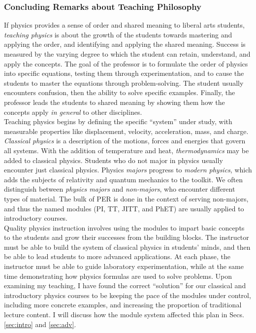 \documentclass[../../../main.tex]{subfiles}
\begin{document}
\subsubsection{Concluding Remarks about Teaching Philosophy}

If physics provides a sense of order and shared meaning to liberal arts students, \textit{teaching physics} is about the growth of the students towards mastering and applying the order, and identifying and applying the shared meaning.  Success is measured by the varying degree to which the student can retain, understand, and apply the concepts.  The goal of the professor is to formulate the order of physics into specific equations, testing them through experimentation, and to cause the students to master the equations through problem-solving.  The student usually encounters confusion, then the ability to solve specific examples.  Finally, the professor leads the students to shared meaning by showing them how the concepts apply \textit{in general} to other disciplines.
\\
\vspace{0.25cm}
Teaching physics begins by defining the specific ``system'' under study, with measurable properties like displacement, velocity, acceleration, mass, and charge.  \textit{Classical physics} is a description of the motions, forces and energies that govern all systems.  With the addition of temperature and heat, \textit{thermodynamics} may be added to classical physics.  Students who do not major in physics usually encounter just classical physics.  Physics \textit{majors} progress to \textit{modern physics}, which adds the subjects of relativity and quantum mechanics to the toolkit.  We often distinguish between \textit{physics majors} and \textit{non-majors}, who encounter different types of material.  The bulk of PER is done in the context of serving non-majors, and thus the named modules (PI, TT, JITT, and PhET) are usually applied to introductory courses.
\\
\vspace{0.25cm}
Quality physics instruction involves using the modules to impart basic concepts to the students and grow their successes from the building blocks.  The instructor must be able to build the system of classical physics in students' minds, and then be able to lead students to more advanced applications.  At each phase, the instructor must be able to guide laboratory experimentation, while at the same time demonstrating how physics formulas are used to solve problems.  Upon examining my teaching, I have found the correct ``solution'' for our classical and introductory physics courses to be keeping the pace of the modules under control, including more concrete examples, and increasing the proportion of traditional lecture content.  I will discuss how the module system affected this plan in Secs. \ref{sec:intro} and \ref{sec:adv}.
\end{document}
